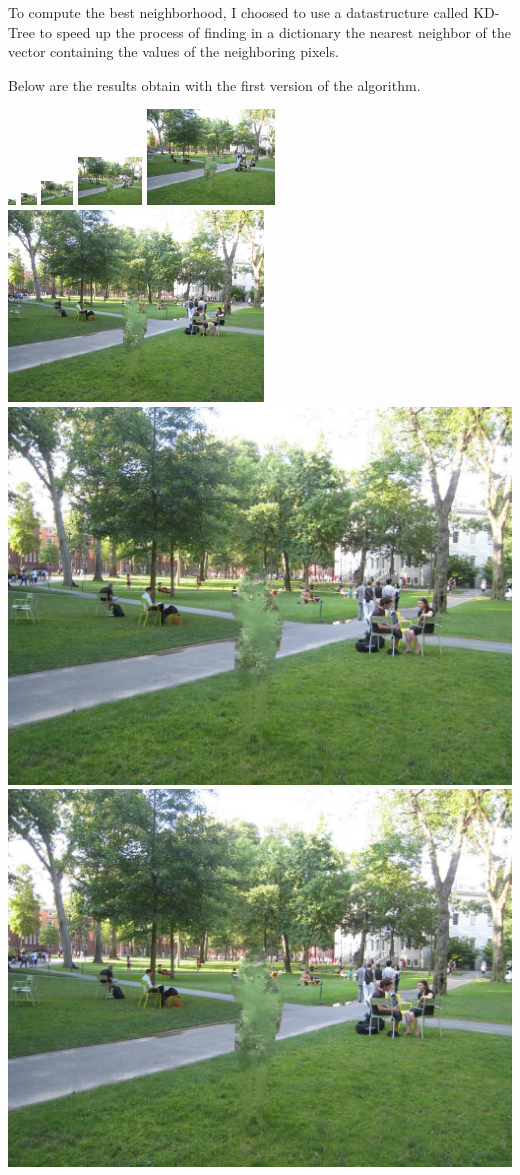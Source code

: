 \documentclass[a4paper]{article}
\begin{document}
  \medskip To compute the best neighborhood, I choosed to use a datastructure called KD-Tree to speed up the process of finding in a dictionary the nearest neighbor of the vector containing the values of the neighboring pixels.
  
  \medskip Below are the results obtain with the first version of the algorithm.
  
  \medskip 
  \begin{center}
  \includegraphics[width=.003\textwidth]{results_texture/1/6x8_output.png}
  \includegraphics[width=.006\textwidth]{results_texture/1/12x16_output.png}
  \includegraphics[width=.0125\textwidth]{results_texture/1/24x32_output.png}
  \includegraphics[width=.025\textwidth]{results_texture/1/48x64_output.png}
  \includegraphics[width=.05\textwidth]{results_texture/1/96x128_output.png}
  \includegraphics[width=.1\textwidth]{results_texture/1/192x256_output.png}
  \includegraphics[width=.2\textwidth]{results_texture/1/384x512_output.png}
  \includegraphics[width=.4\textwidth]{results_texture/1/768x1024_output.png}
  \end{center}
  
\end{document}
